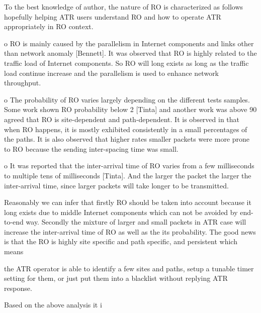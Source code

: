 To the best knowledge of author, the nature of RO is characterized as
follows hopefully helping ATR users understand RO and how to operate
ATR appropriately in RO context.

o  RO is mainly caused by the parallelism in Internet components and
   links other than network anomaly [Bennett].  It was observed that
   RO is highly related to the traffic load of Internet components.
   So RO will long exists as long as the traffic load continue
   increase and the parallelism is used to enhance network
   throughput.

o  The probability of RO varies largely depending on the different
   tests samples.  Some work shown RO probability below 2%
   [Tinta] and another work was above 90%
   agreed that RO is site-dependent and path-dependent.  It is
   observed in that when RO happens, it is mostly exhibited
   consistently in a small percentages of the paths.  It is also
   observed that higher rates smaller packets were more prone to RO
   because the sending inter-spacing time was small.

o  It was reported that the inter-arrival time of RO varies from a
   few milliseconds to multiple tens of milliseconds [Tinta].  And
   the larger the packet the larger the inter-arrival time, since
   larger packets will take longer to be transmitted.

Reasonably we can infer that firstly RO should be taken into account
because it long exists due to middle Internet components which can
not be avoided by end-to-end way.  Secondly the mixture of larger and
small packets in ATR case will increase the inter-arrival time of RO
as well as the its probability.  The good news is that the RO is
highly site specific and path specific, and persistent which means

the ATR operator is able to identify a few sites and paths, setup a
tunable timer setting for them, or just put them into a blacklist
without replying ATR response.

Based on the above analysis it i